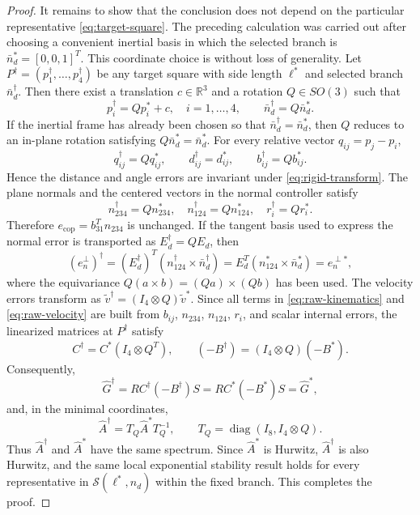 \documentclass[letterpaper,journal]{IEEEtran}
\theoremstyle{plain}
\theoremstyle{definition}
\theoremstyle{remark}
\begin{document}
\begin{proof}
It remains to show that the conclusion does not depend on the particular representative \eqref{eq:target-square}. The preceding calculation was carried out after choosing a convenient inertial basis in which the selected branch is \(\bar n_d^*=[0,0,1]^T\). This coordinate choice is without loss of generality. Let \(P^\dagger=(p_1^\dagger,\ldots,p_4^\dagger)\) be any target square with side length \(\ell^*\) and selected branch \(\bar n_d^\dagger\). Then there exist a translation \(c\in\mathbb R^3\) and a rotation \(Q\in SO(3)\) such that
\begin{equation}
p_i^\dagger=Qp_i^*+c,\quad i=1,\ldots,4,
\qquad \bar n_d^\dagger=Q\bar n_d^*.
\label{eq:rigid-transform}
\end{equation}
If the inertial frame has already been chosen so that \(\bar n_d^\dagger=\bar n_d^*\), then \(Q\) reduces to an in-plane rotation satisfying \(Q\bar n_d^*=\bar n_d^*\).
For every relative vector \(q_{ij}=p_j-p_i\),
\[
q_{ij}^\dagger=Qq_{ij}^*,\qquad
d_{ij}^\dagger=d_{ij}^*,\qquad
b_{ij}^\dagger=Qb_{ij}^*.
\]
Hence the distance and angle errors are invariant under \eqref{eq:rigid-transform}. The plane normals and the centered vectors in the normal controller satisfy
\begin{equation}
n_{234}^\dagger=Qn_{234}^*,\quad
n_{124}^\dagger=Qn_{124}^*,\quad
r_i^\dagger=Qr_i^*.
\label{eq:normal-coordinate-transform}
\end{equation}
Therefore \(e_{\mathrm{cop}}=b_{31}^Tn_{234}\) is unchanged. If the tangent basis used to express the normal error is transported as \(E_d^\dagger=QE_d\), then
\begin{equation}
(e_n^\perp)^\dagger=(E_d^\dagger)^T(n_{124}^\dagger\times\bar n_d^\dagger)
=E_d^T(n_{124}^*\times\bar n_d^*)=e_n^{\perp *},
\label{eq:normal-error-coordinate-transform}
\end{equation}
where the equivariance \(Q(a\times b)=(Qa)\times(Qb)\) has been used.
The velocity errors transform as \(\tilde v^\dagger=(I_4\otimes Q)\tilde v^*\). Since all terms in \eqref{eq:raw-kinematics} and \eqref{eq:raw-velocity} are built from \(b_{ij}\), \(n_{234}\), \(n_{124}\), \(r_i\), and scalar internal errors, the linearized matrices at \(P^\dagger\) satisfy
\begin{equation}
C^\dagger=C^*(I_4\otimes Q^T),\qquad
(-B^\dagger)=(I_4\otimes Q)(-B^*).
\label{eq:CB-coordinate-transform}
\end{equation}
Consequently,
\[
\hat G^\dagger=RC^\dagger(-B^\dagger)S
=RC^*(-B^*)S=\hat G^*,
\]
and, in the minimal coordinates,
\begin{equation}
\hat A^\dagger=T_Q\hat A^*T_Q^{-1},\qquad
T_Q=\operatorname{diag}(I_8,I_4\otimes Q).
\label{eq:A-coordinate-transform}
\end{equation}
Thus \(\hat A^\dagger\) and \(\hat A^*\) have the same spectrum. Since \(\hat A^*\) is Hurwitz, \(\hat A^\dagger\) is also Hurwitz, and the same local exponential stability result holds for every representative in \(\mathcal S(\ell^*,n_d)\) within the fixed branch. This completes the proof.
\end{proof}
\end{document}
